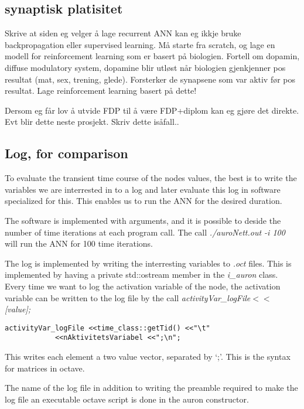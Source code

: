 	\subsection{synaptisk platisitet}
	Skrive at siden eg velger å lage recurrent ANN kan eg ikkje bruke backpropagation eller supervised learning. Må starte fra scratch, og lage en modell for reinforcement learning som er basert på biologien. 
	Fortell om dopamin, diffuse modulatory system, dopamine blir utløst når biologien gjenkjenner pos resultat (mat, sex, trening, glede). Forsterker de synapsene som var aktiv før pos resultat. 
	Lage reinforcement learning basert på dette!

	Dersom eg får lov å utvide FDP til å være FDP+diplom kan eg gjøre det direkte. Evt blir dette neste prosjekt. Skriv dette isåfall..




\subsection{Log, for comparison}
\label{ssecLogForComparison}
To evaluate the transient time course of the nodes values, the best is to write the variables we are interrested in to a log and later evaluate this log in software specialized for this.
This enables us to run the ANN for the desired duration. 

The software is implemented with arguments, and it is possible to deside the number of time iterations at each program call.
The call \emph{./auroNett.out -i 100} will run the ANN for 100 time iterations.

The log is implemented by writing the interresting variables to \emph{.oct} files. This is implemented by having a private std::ostream member in the \emph{i\_auron} class.
Every time we want to log the activation variable of the node, the activation variable can be written to the log file by the call \emph{activityVar\_logFile$<<$ [value];}
\begin{lstlisting}
activityVar_logFile <<time_class::getTid() <<"\t" 
  		    <<nAktivitetsVariabel <<";\n";
\end{lstlisting}

This writes each element a two value vector, separated by `;'. This is the syntax for matrices in octave.

The name of the log file in addition to writing the preamble required to make the log file an executable octave script is done in the auron constructor.

